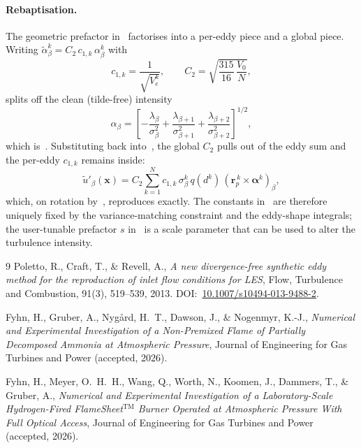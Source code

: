\documentclass[
 amsmath,amssymb,
 aps,
 twocolumn,
]{revtex4-2}
\renewcommand{\vec}[1]{\boldsymbol{#1}}
\begin{document}
\paragraph*{Rebaptisation.}
The geometric prefactor in~ factorises into a
per-eddy piece and a global piece. Writing
$\tilde\alpha_\beta^k = C_2\,c_{1,k}\,\alpha_\beta^k$ with
\begin{equation}\label{eq:app_rebaptize}
  c_{1,k} = \frac{1}{\sqrt{V_e^k}},\qquad
  C_2 = \sqrt{\frac{315}{16}\,\frac{V_0}{N}},
\end{equation}
splits off the clean (tilde-free) intensity
\begin{equation}\label{eq:app_alpha_clean}
  \alpha_\beta = \!\left[-\frac{\lambda_\beta}{\sigma_\beta^2}
       + \frac{\lambda_{\beta+1}}{\sigma_{\beta+1}^2}
       + \frac{\lambda_{\beta+2}}{\sigma_{\beta+2}^2}\right]^{1/2},
\end{equation}
which is~. Substituting back into~,
the global $C_2$ pulls out of the eddy sum and the per-eddy $c_{1,k}$
remains inside:
\begin{equation}\label{eq:app_final}
  \tilde u'_\beta(\vec x)
  = C_2 \sum_{k=1}^N c_{1,k}\,\sigma_\beta^k\,q(d^k)\,
    (\vec r_p^{\,k}\times\vec\alpha^k)_\beta,
\end{equation}
which, on rotation by~, reproduces
 exactly. The constants
in~ are therefore uniquely fixed by the
variance-matching constraint and the eddy-shape integrals; the
user-tunable prefactor $s$ in~ is a scale parameter
that can be used to alter the turbulence intensity.

\begin{thebibliography}{9}
  Poletto, R., Craft, T., \& Revell, A.,
  \emph{A new divergence-free synthetic eddy method for the reproduction of
  inlet flow conditions for LES},
  Flow, Turbulence and Combustion, 91(3), 519--539, 2013.
  DOI:~\href{https://doi.org/10.1007/s10494-013-9488-2}{10.1007/s10494-013-9488-2}.

  Fyhn, H., Gruber, A., Nyg\aa rd, H.~T., Dawson, J., \& Nogenmyr, K.-J.,
  \emph{Numerical and Experimental Investigation of a Non-Premixed Flame
  of Partially Decomposed Ammonia at Atmospheric Pressure},
  Journal of Engineering for Gas Turbines and Power (accepted, 2026).

  Fyhn, H., Meyer, O.~H.~H., Wang, Q., Worth, N., Koomen, J., Dammers, T., \& Gruber, A.,
  \emph{Numerical and Experimental Investigation of a Laboratory-Scale
  Hydrogen-Fired FlameSheet$^\text{TM}$ Burner Operated at Atmospheric
  Pressure With Full Optical Access},
  Journal of Engineering for Gas Turbines and Power (accepted, 2026).

\end{thebibliography}
\end{document}

